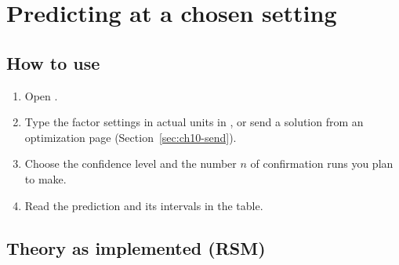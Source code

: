 \section{Predicting at a chosen setting}\label{sec:ch10-predict}

\subsection{How to use}

\begin{enumerate}
  \item Open .
  \item Type the factor settings in actual units in , or send a solution from
    an optimization page (Section~\ref{sec:ch10-send}).
  \item Choose the confidence level and the number $n$ of confirmation runs you plan to make.
  \item Read the prediction and its intervals in the table.
\end{enumerate}

\subsection{Theory as implemented (RSM)}\label{sec:ch10-theory}

